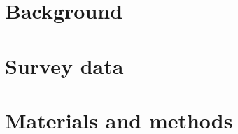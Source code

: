 \documentclass{somasmsc}
\begin{document}
\newcommand{\yourtitle}{Nativity Status and Dental Caries in the US Paediatric Population}
\newcommand{\yourname}{Nasir Zeeshan Bashir}


\pagestyle{empty}
\frontmatter
\maketitle
\pagestyle{plain}
\tableofcontents
\newpage


\setlength{\headheight}{16pt}
\fancyhead{}
\fancyfoot{}
\pagestyle{fancy}
\fancyhead[RO,LE]{\thepage}
\fancyhead[LO,RE]{\rightmark}

\newcommand{\studentcomment}[1]{\todo[inline, backgroundcolor = blue!30]{\textsc{\yourname:} #1}}
\newcommand{\DSWcomment}[1]{\todo[inline, backgroundcolor = green!30]{\textsc{DSW:} #1}}
\newcommand{\supcomment}[1]{\todo[inline, backgroundcolor = red!30]{\textsc{Supervisor:} #1}}

\mainmatter



\chapter{Background}\label{intro}


\chapter{Survey data}\label{surveys}


\chapter{Materials and methods}\label{methods}

\end{document}
